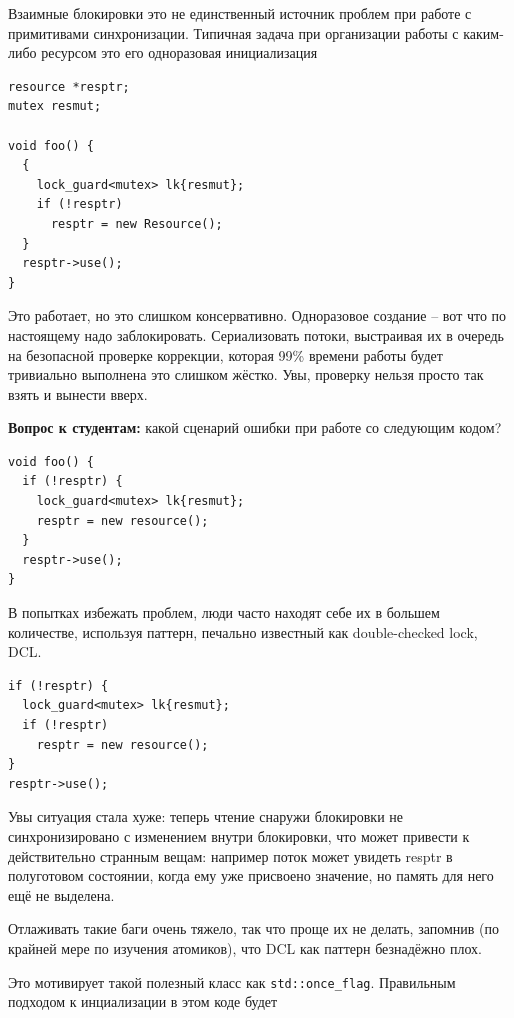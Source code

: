 \documentclass[a4paper,12pt,oneside]{book}
\newif\ifanswers
\begin{document}
Взаимные блокировки это не единственный источник проблем при работе с примитивами синхронизации. Типичная задача при организации работы с каким-либо ресурсом это его одноразовая инициализация

\begin{lstlisting}
resource *resptr;
mutex resmut;

void foo() {
  {
    lock_guard<mutex> lk{resmut};
    if (!resptr)
      resptr = new Resource();    
  }
  resptr->use();
}
\end{lstlisting}

Это работает, но это слишком консервативно. Одноразовое создание -- вот что по настоящему надо заблокировать. Сериализовать потоки, выстраивая их в очередь на безопасной проверке коррекции, которая 99\% времени работы будет тривиально выполнена это слишком жёстко. Увы, проверку нельзя просто так взять и вынести вверх.

\textbf{Вопрос к студентам:} какой сценарий ошибки при работе со следующим кодом?

\begin{lstlisting}
void foo() {
  if (!resptr) {
    lock_guard<mutex> lk{resmut};
    resptr = new resource();    
  }
  resptr->use();
}
\end{lstlisting}

\ifanswers
Правильный ответ: два потока одновременно проверяют \lstinline!resptr!, после чего устраивают там ад с утечками памяти.
\fi

В попытках избежать проблем, люди часто находят себе их в большем количестве, используя паттерн, печально известный как double-checked lock, DCL.

\begin{lstlisting}
if (!resptr) {
  lock_guard<mutex> lk{resmut};
  if (!resptr)
    resptr = new resource();
}
resptr->use();
\end{lstlisting}

Увы ситуация стала хуже: теперь чтение снаружи блокировки не синхронизировано с изменением внутри блокировки, что может привести к действительно странным вещам: например поток может увидеть resptr в полуготовом состоянии, когда ему уже присвоено значение, но память для него ещё не выделена.

Отлаживать такие баги очень тяжело, так что проще их не делать, запомнив (по крайней мере по изучения атомиков), что DCL как паттерн безнадёжно плох.

Это мотивирует такой полезный класс как \lstinline!std::once_flag!. Правильным подходом к инциализации в этом коде будет
\end{document}

